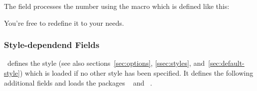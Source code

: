 \documentclass[load-preamble+]{cnltx-doc}
\begin{document}
The  field processes the number using the macro
 which is defined like this:
\begin{sourcecode}
  \def\@CAS#1-#2-#3\relax{}
  \NewDocumentCommand{}
\end{sourcecode}
You're free to redefine it to your needs.

\subsubsection{Style-dependend Fields}
\substances\ defines the style  (see also
sections~\ref{sec:options}, \ref{ssec:styles}, and~\ref{sec:default-style})
which is loaded if no other style has been specified. It defines the following
additional fields and loads the packages ~\cite{pkg:chemfig} and
~\cite{pkg:siunitx}.
\end{document}
